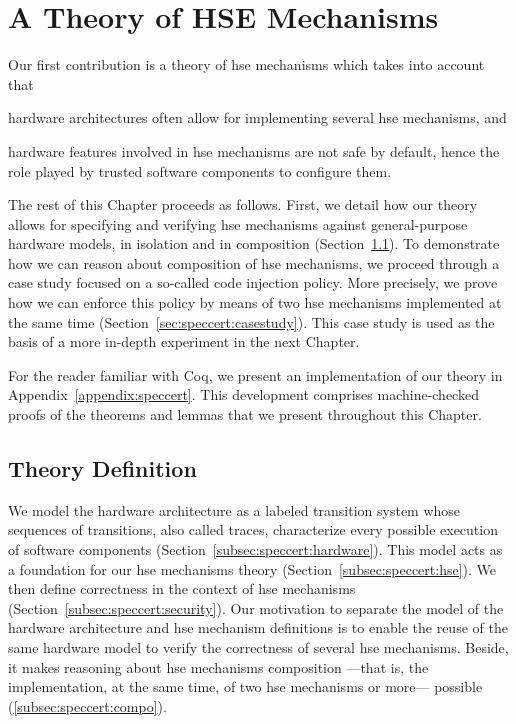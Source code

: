 \chapter{A Theory of HSE Mechanisms}
\label{chapter:speccert}


\vspace{1cm}%
\noindent
%
Our first contribution is a theory of \ac{hse} mechanisms which takes into
account that
%
\begin{inparaenum}[(1)]
\item hardware architectures often allow for implementing several \ac{hse}
  mechanisms, and
\item hardware features involved in \ac{hse} mechanisms are not safe by default,
  hence the role played by trusted software components to configure them.
\end{inparaenum}
%
The rest of this Chapter proceeds as follows.
%
First, we detail how our theory allows for specifying and verifying \ac{hse}
mechanisms against general-purpose hardware models, in isolation and in
composition (Section~\ref{sec:speccert:theory}).
%
To demonstrate how we can reason about composition of \ac{hse} mechanisms, we
proceed through a case study focused on a so-called code injection policy.
%
More precisely, we prove how we can enforce this policy by means of two \ac{hse}
mechanisms implemented at the same time (Section~\ref{sec:speccert:casestudy}).
%
This case study is used as the basis of a more in-depth experiment in the next
Chapter.

For the reader familiar with Coq, we present an implementation of our theory in
Appendix~\ref{appendix:speccert}.
%
This development comprises machine-checked proofs of the theorems and lemmas
that we present throughout this Chapter.

\section{Theory Definition}
\label{sec:speccert:theory}

We model the hardware architecture as a labeled transition system whose
sequences of transitions, also called traces, characterize every possible
execution of software components (Section~\ref{subsec:speccert:hardware}).
%
This model acts as a foundation for our \ac{hse} mechanisms theory
(Section~\ref{subsec:speccert:hse}).
%
We then define correctness in the context of \ac{hse} mechanisms
(Section~\ref{subsec:speccert:security}).
%
Our motivation to separate the model of the hardware architecture and \ac{hse}
mechanism definitions is to enable the reuse of the same hardware model to
verify the correctness of several \ac{hse} mechanisms.
%
Beside, it makes reasoning about \ac{hse} mechanisms composition ---that is, the
implementation, at the same time, of two \ac{hse} mechanisms or more--- possible
(\ref{subsec:speccert:compo}).

